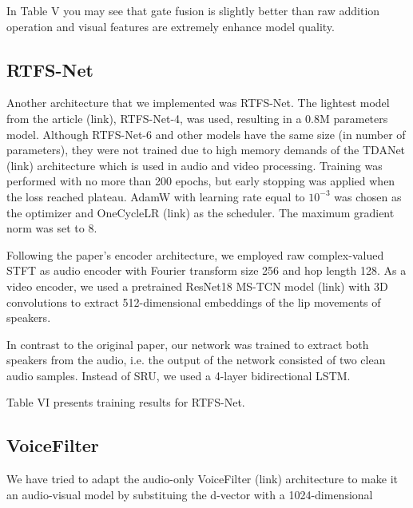 \documentclass[10pt,conference,compsocconf]{IEEEtran}
\begin{document}
In Table V you may see that gate fusion is slightly better than raw addition operation and visual features are extremely enhance model quality.

\subsection{\textbf{RTFS-Net}}
Another architecture that we implemented was RTFS-Net. The lightest model from the article (link), RTFS-Net-4, was used, resulting in a 0.8M parameters model. Although RTFS-Net-6 and other models have the same size (in number of parameters), they were not trained due to high memory demands of the TDANet (link) architecture which is used in audio and video processing. Training was performed with no more than 200 epochs, but early stopping was applied when the loss reached plateau. AdamW with learning rate equal to $10^{-3}$ was chosen as the optimizer and OneCycleLR (link) as the scheduler. The maximum gradient norm was set to 8.

Following the paper's encoder architecture, we employed raw complex-valued STFT as audio encoder with Fourier transform size 256 and hop length 128. As a video encoder, we used a pretrained ResNet18 MS-TCN model (link) with 3D convolutions to extract 512-dimensional embeddings of the lip movements of speakers.

In contrast to the original paper, our network was trained to extract both speakers from the audio, i.e. the output of the network consisted of two clean audio samples. Instead of SRU, we used a 4-layer bidirectional LSTM.

Table VI presents training results for RTFS-Net.
\begin{table}[h!]
\centering
\caption{RTFS-Net training results.}
\end{table}

\subsection{VoiceFilter}
We have tried to adapt the audio-only VoiceFilter (link) architecture to make it an audio-visual model by substituing the d-vector with a 1024-dimensional 
\end{document}
